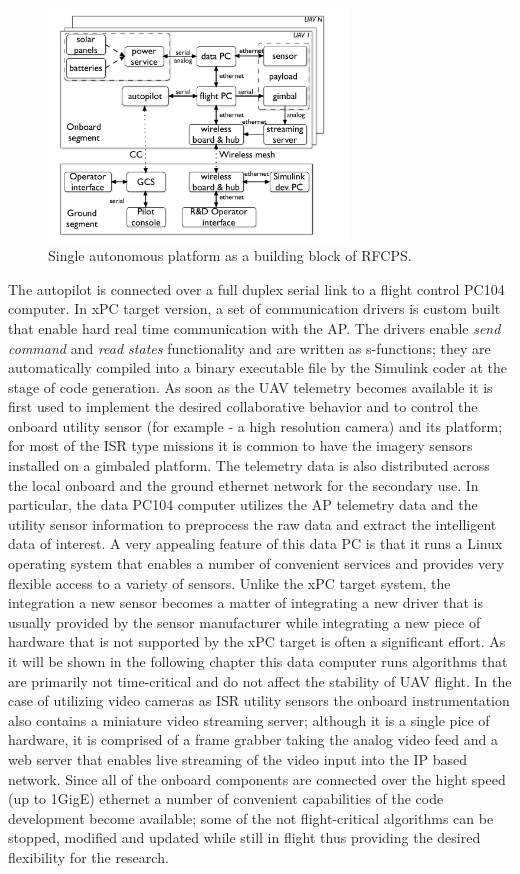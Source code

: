 \documentclass[letterpaper, 10 pt, conference]{ieeeconf}  %
\begin{document}
\begin{figure}[h]
	\centering
	\includegraphics[width=80mm]{Pictures/Figure_02.pdf}
	\caption{Single autonomous platform as a building block of RFCPS.}
	\label{fig:RFCPS_arch}
\end{figure}


The autopilot is connected over a full duplex serial link to a flight control PC104 computer. In xPC target version, a set of communication drivers is custom built that enable hard real time communication with the AP. The drivers enable \emph{send command} and \emph{read states} functionality and are written as s-functions; they are automatically compiled into a binary executable file by the Simulink coder at the stage of code generation. As soon as the UAV telemetry becomes available it is first used to implement the desired collaborative behavior and to control the onboard utility sensor (for example  - a high resolution camera) and its platform; for most of the ISR type missions it is common to have the imagery sensors installed on a gimbaled platform. The telemetry data is also distributed across the local onboard and the ground ethernet network for the secondary use. In particular, the data PC104 computer utilizes the AP telemetry data and the utility sensor information to preprocess the raw data and extract the intelligent data of interest. A very appealing feature of this data PC is that it runs a Linux operating system that enables a number of convenient services and provides very flexible access to a variety of sensors. Unlike the xPC target system, the integration a new sensor becomes a matter of integrating a new driver that is usually provided by the sensor manufacturer while integrating a new piece of hardware that is not supported by the xPC target is often a significant effort. As it will be shown in the following chapter this data computer runs algorithms that are primarily not time-critical and do not affect the stability of UAV  flight. In the case of utilizing video cameras as ISR utility sensors the onboard instrumentation also contains a miniature video streaming server; although it is a single pice of hardware,  it is comprised of a frame grabber taking the analog video feed and a web server that enables live streaming of the video input into the IP based network. Since all of the onboard components are connected over the hight speed (up to 1GigE) ethernet a number of convenient capabilities of the code development become available; some of the not flight-critical algorithms can be stopped, modified and updated while still in flight thus providing the desired flexibility for the research.
\end{document}
